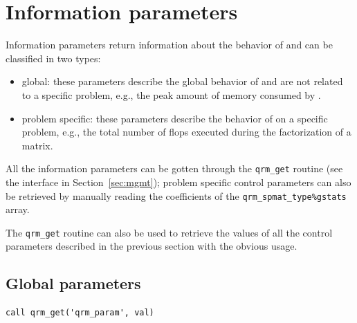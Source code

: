 \documentclass[11pt]{article}
\begin{document}
\section{Information parameters}
\label{sec:info}

Information parameters return information about the behavior of \qrm
and can be classified in two types:
\begin{itemize}
\item global: these parameters describe the global behavior of \qrm and
  are not related to a specific problem, e.g., the peak amount of
  memory consumed by \qrm.
\item problem specific: these parameters describe the behavior of \qrm
  on a specific problem, e.g., the total number of flops executed
  during the factorization of a matrix.
\end{itemize}

All the information parameters can be gotten through the \texttt{qrm\_get}
routine (see the interface in Section~\ref{sec:mgmt}); problem
specific control parameters can also be retrieved by manually reading the
coefficients of the \texttt{qrm\_spmat\_type\%gstats} array. 

The \texttt{qrm\_get} routine can also be used to retrieve the values
of all the control parameters described in the previous section with
the obvious usage.

\subsection{Global parameters}
\label{sec:gparms}

\begin{lstlisting}
call qrm_get('qrm_param', val)
\end{lstlisting}
\end{document}
